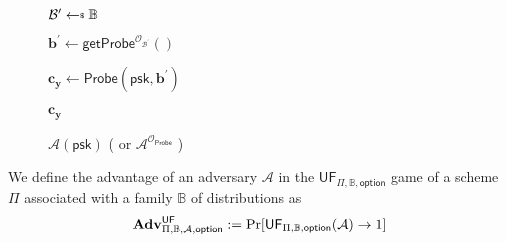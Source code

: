 		
		





	

\begin{figure}[h]
\centering
	\begin{minipage}[t]{0.6\linewidth}
	\centering
	\begin{algorithm}[H]
	\caption{$\mathcal{A}(\textsf{psk})$ ( or $\mathcal{A}^{\mathcal{O}_\textsf{Probe}}$ ) }
	\label{alg:adv:FP}
	\begin{algorithmic}[1]
		\State $\mathcal{B}^\prime \getsdollar \mathbb{B}$
		
		\State $\mathbf{b}^\prime \gets \textsf{getProbe}^{\mathcal{O}_{\mathcal{B}^\prime }}()$

		\State $\mathbf{c_y} \gets \textsf{Probe}(\textsf{psk}, \mathbf{b}^\prime)$ 

		\State \Return $\mathbf{c_y}$
	\end{algorithmic}
	\end{algorithm}
	\end{minipage}
	
\end{figure}


We define the advantage of an adversary $\mathcal{A}$ in the $\textsf{UF}_{\Pi, \mathbb{B}, \textsf{option}}$ game of a scheme $\Pi$ associated with a family $\mathbb{B}$ of distributions as
\[
	\mathbf{Adv}^{\textsf{UF}}_{\Pi, \mathbb{B}, \mathcal{A}, \textsf{option}} := \Pr[\textsf{UF}_{\Pi, \mathbb{B}, \textsf{option}}(\mathcal{A}) \to 1]
\]

